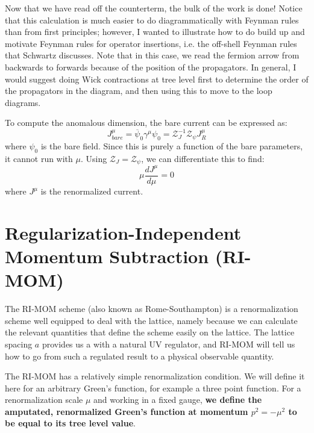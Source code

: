 \documentclass[11pt, oneside]{article}   	%
\theoremstyle{definition}
\begin{document}
Now that we have read off the counterterm, the bulk of the work is done! Notice that this calculation is much easier to do 
diagrammatically with Feynman rules than from first principles; however, I wanted to illustrate how to do build up and 
motivate Feynman rules for operator insertions, i.e. the off-shell Feynman rules that Schwartz discusses. Note that in 
this case, we read the fermion arrow from backwards to forwards because of the position of the propagators. In general, 
I would suggest doing Wick contractions at tree level first to determine the order of the propagators in the diagram, and then 
using this to move to the loop diagrams. 

To compute the anomalous dimension, the bare current can be expressed as:
\begin{equation}
	J_{bare}^\mu = \overline\psi_0\gamma^\mu\psi_0 = \mathcal Z_J^{-1}\mathcal Z_\psi J_R^\mu
\end{equation}
where $\psi_0$ is the bare field. Since this is purely a function of the bare parameters, it cannot run with $\mu$. Using 
$\mathcal Z_J = \mathcal Z_\psi$, we can differentiate this to find:
\begin{equation}
	\mu \frac{dJ^\mu}{d\mu} = 0
\end{equation}
where $J^\mu$ is the renormalized current. 




\section{Regularization-Independent Momentum Subtraction (RI-MOM)}

The RI-MOM scheme (also known as Rome-Southampton) is a renormalization scheme well equipped to deal with 
the lattice, namely because we can calculate the relevant quantities that define the scheme easily on the lattice. The 
lattice spacing $a$ provides us a with a natural UV regulator, and RI-MOM will tell us how to go from such a regulated 
result to a physical observable quantity. 

The RI-MOM has a relatively simple renormalization condition. We will define it here for an arbitrary Green's function, 
for example a three point function. For a renormalization scale $\mu$ and working in a fixed gauge, \textbf{we 
define the amputated, renormalized Green's function at momentum $p^2 = -\mu^2$ to be equal to its tree level 
value}. 
\end{document}
